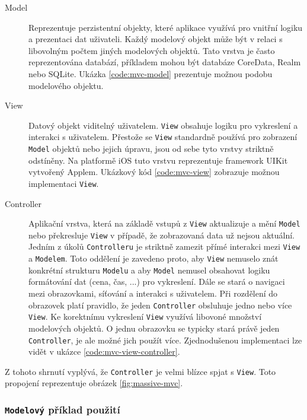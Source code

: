 \begin{description}
  \item[Model] Reprezentuje perzistentní objekty, které aplikace využívá pro vnitřní logiku a prezentaci dat uživateli.
  Každý modelový objekt může být v relaci s libovolným počtem jiných modelových objektů.
  Tato vrstva je často reprezentována databází, příkladem mohou být databáze CoreData, Realm nebo SQLite.
  Ukázka \ref{code:mvc-model} prezentuje možnou podobu modelového objektu.

  \item[View] Datový objekt viditelný uživatelem. \texttt{View} obsahuje logiku pro vykreslení a interakci s uživatelem.
  Přestože se \texttt{View} standardně používá pro zobrazení \texttt{Model} objektů nebo jejich úpravu, jsou od sebe tyto vrstvy striktně odstíněny.
  Na platformě iOS tuto vrstvu reprezentuje framework UIKit vytvořený Applem.
  Ukázkový kód \ref{code:mvc-view} zobrazuje možnou implementaci \texttt{View}.

  \item[Controller] Aplikační vrstva, která na základě vstupů z \texttt{View} aktualizuje a mění \texttt{Model} nebo překresluje \texttt{View} v případě, že zobrazovaná data už nejsou aktuální.
  Jedním z úkolů \texttt{Controlleru} je striktně zamezit přímé interakci mezi \texttt{View} a \texttt{Modelem}.
  Toto oddělení je zavedeno proto, aby \texttt{View} nemuselo znát konkrétní strukturu \texttt{Modelu} a aby \texttt{Model} nemusel obsahovat logiku formátování dat (cena, čas, ...) pro vykreslení.
  Dále se stará o navigaci mezi obrazovkami, síťování a interakci s uživatelem.
  Při rozdělení do obrazovek platí pravidlo, že jeden \texttt{Controller} obsluhuje jedno nebo více \texttt{View}.
  Ke korektnímu vykreslení \texttt{View} využívá libovoné množství modelových objektů.
  O jednu obrazovku se typicky stará právě jeden \texttt{Controller}, je ale možné jich použít více.
  Zjednodušenou implementaci lze vidět v ukázce \ref{code:mvc-view-controller}.
\end{description}

Z tohoto shrnutí vyplývá, že \texttt{Controller} je velmi blízce spjat s \texttt{View}. Toto propojení reprezentuje obrázek \ref{fig:massive-mvc}.

\subsubsection*{\texttt{Modelový} příklad použití}

